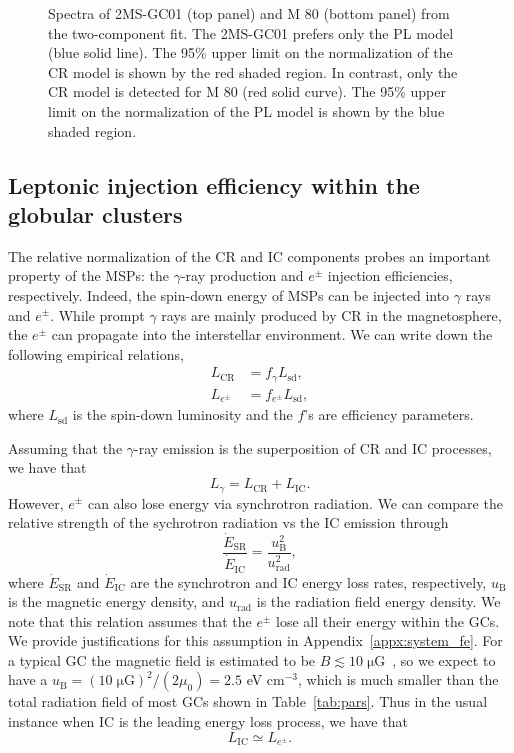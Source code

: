 \documentclass[doublespace,draft,nopageskip]{VTthesis} %
\begin{document}
\begin{figure}
    \caption{Spectra of 2MS-GC01 (top panel) and M 80 (bottom panel) from the two-component fit. The 2MS-GC01 prefers only the {PL} model (blue solid line). The 95\% upper limit on the normalization of the CR model is shown by the red shaded region. In contrast, only the CR model is detected for M 80 (red solid curve). The 95\% upper limit on the normalization of the {PL} model is shown by the blue shaded region.}
    \label{fig:global_spectra_ul}
\end{figure}

\subsection{Leptonic injection efficiency within the globular clusters}\label{spectra_fe}

The relative normalization of the CR and IC components probes an important property of the MSPs: the $\gamma$-ray production and $e^\pm$ injection efficiencies, respectively. Indeed, the spin-down energy of MSPs can be injected into $\gamma$ rays and $e^\pm$. While prompt $\gamma$ rays are mainly produced by CR in the magnetosphere, the $e^\pm$ can propagate into the interstellar environment. We can write down the following empirical relations,
\begin{align}
    L_\mathrm{CR} &= f_\gamma L_\mathrm{sd},\\
    L_{e^\pm} &= f_{e^\pm} L_\mathrm{sd},
\end{align}
where $L_\mathrm{sd}$ is the spin-down luminosity and the $f$'s are efficiency parameters. 

Assuming that the $\gamma$-ray emission is the superposition of CR and IC processes, we have that
\begin{equation}
    L_\gamma = L_\mathrm{CR} + L_\mathrm{IC}.
\end{equation}
However, $e^\pm$ can also lose energy via synchrotron radiation. We can compare the relative strength of the sychrotron radiation vs the IC emission through
\begin{equation}
    \frac{\dot{E}_\mathrm{SR}}{\dot{E}_\mathrm{IC}} = \frac{u_\mathrm{B}^2}{u_\mathrm{rad}^2},
\end{equation}
where $\dot{E}_\mathrm{SR}$ and $\dot{E}_\mathrm{IC}$ are the synchrotron and IC energy loss rates, respectively, $u_\mathrm{B}$ is the magnetic energy density, and $u_\mathrm{rad}$ is the radiation field energy density. We note that this relation assumes that the $e^\pm$ lose all their energy within the GCs. We provide justifications for this assumption in Appendix~\ref{appx:system_fe}. For a typical GC the magnetic field is estimated to be $B\lesssim \mathrm{10\;\mu G}$~\citep{2007MNRAS.377..920B}, so we expect to have a $u_\mathrm{B} = {\mathrm{(10\;\mu G)}^2}/{(2\mu_0)} = 2.5$ eV cm$^{-3}$, which is much smaller than the total radiation field of most GCs shown in Table~\ref{tab:pars}. Thus in the usual instance when IC is the leading energy loss process, we have that
\begin{equation}
    L_\mathrm{IC} \simeq L_{e^\pm}.
\end{equation}
\end{document}
